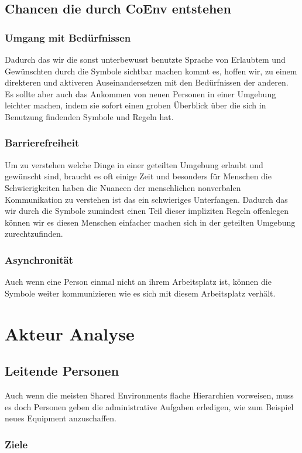 \documentclass{article}
\begin{document}
\subsection{Chancen die durch CoEnv entstehen}

\subsubsection*{Umgang mit Bedürfnissen}
Dadurch das wir die sonst unterbewusst benutzte Sprache von Erlaubtem und Gewünschten durch die Symbole sichtbar machen kommt es, hoffen wir, zu einem direkteren und aktiveren Auseinandersetzen mit den Bedürfnissen der anderen. Es sollte aber auch das Ankommen von neuen Personen in einer Umgebung leichter machen, indem sie sofort einen groben Überblick über die sich in Benutzung findenden Symbole und Regeln hat.
\subsubsection*{Barrierefreiheit}
Um zu verstehen welche Dinge in einer geteilten Umgebung erlaubt und gewünscht sind, braucht es oft einige Zeit und besonders für Menschen die Schwierigkeiten haben die Nuancen der menschlichen nonverbalen Kommunikation zu verstehen ist das ein schwieriges Unterfangen. Dadurch das wir durch die Symbole zumindest einen Teil dieser impliziten Regeln offenlegen können wir es diesen Menschen einfacher machen sich in der geteilten Umgebung zurechtzufinden.
\subsubsection*{Asynchronität}
Auch wenn eine Person einmal nicht an ihrem Arbeitsplatz ist, können die Symbole weiter kommunizieren wie es sich mit diesem Arbeitsplatz verhält.

\section{Akteur Analyse}


\subsection{Leitende Personen}

Auch wenn die meisten Shared Environments flache Hierarchien vorweisen, muss es doch Personen geben die administrative Aufgaben erledigen, wie zum Beispiel neues Equipment anzuschaffen.

\subsubsection*{Ziele}
\end{document}
